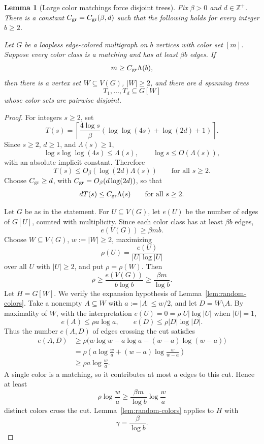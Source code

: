 \documentclass{amsart}
\newtheorem{lemma}[theorem]{Lemma}
\theoremstyle{definition}
\theoremstyle{remark}
\newcommand{\Zpos}{\mathbb{Z}^{+}}
\begin{document}
\begin{lemma}[Large color matchings force disjoint trees]\label{lem:many-matchings}
Fix \(\beta>0\) and \(d\in\Zpos\). There is a constant \(C_{\rm gr}=C_{\rm gr}(\beta,d)\) such that the following holds for every integer \(b\ge2\).

Let \(G\) be a loopless edge-colored multigraph on \(b\) vertices with color set \([m]\). Suppose every color class is a matching and has at least \(\beta b\) edges. If
\[
m\ge C_{\rm gr}\Lambda(b),
\]
then there is a vertex set \(W\subseteq V(G)\), \(|W|\ge2\), and there are \(d\) spanning trees
\[
T_1,\ldots,T_d\subseteq G[W]
\]
whose color sets are pairwise disjoint.
\end{lemma}

\begin{proof}
For integers \(s\ge2\), set
\[
T(s)=
\left\lceil
\frac{4\log s}{\beta}
\left(\log\log(4s)+\log(2d)+1\right)
\right\rceil.
\]
Since \(s\ge2\), \(d\ge1\), and \(\Lambda(s)\ge1\),
\[
\log s\log\log(4s)\le \Lambda(s),
\qquad
\log s\le O(\Lambda(s)),
\]
with an absolute implicit constant. Therefore
\[
T(s)\le O_\beta(\log(2d)\Lambda(s))
\qquad\text{for all }s\ge2.
\]
Choose \(C_{\rm gr}\ge d\), with \(C_{\rm gr}=O_\beta(d\log(2d))\), so that
\[
dT(s)\le C_{\rm gr}\Lambda(s)
\qquad\text{for all }s\ge2.
\]

Let \(G\) be as in the statement. For \(U\subseteq V(G)\), let \(e(U)\) be the number of edges of \(G[U]\), counted with multiplicity. Since each color class has at least \(\beta b\) edges,
\[
e(V(G))\ge \beta mb.
\]
Choose \(W\subseteq V(G)\), \(w:=|W|\ge2\), maximizing
\[
\rho(U)=\frac{e(U)}{|U|\log |U|}
\]
over all \(U\) with \(|U|\ge2\), and put \(\rho=\rho(W)\). Then
\[
\rho\ge \frac{e(V(G))}{b\log b}\ge \frac{\beta m}{\log b}.
\]
Let \(H=G[W]\). We verify the expansion hypothesis of Lemma~\ref{lem:random-colors}. Take a nonempty \(A\subseteq W\) with \(a:=|A|\le w/2\), and let \(D=W\setminus A\). By maximality of \(W\), with the interpretation \(e(U)=0=\rho |U|\log |U|\) when \(|U|=1\),
\[
e(A)\le \rho a\log a,
\qquad
e(D)\le \rho |D|\log |D|.
\]
Thus the number \(e(A,D)\) of edges crossing the cut satisfies
\[
\begin{aligned}
e(A,D)
&\ge \rho\bigl(w\log w-a\log a-(w-a)\log(w-a)\bigr)\\
&=\rho\left(a\log\frac wa+(w-a)\log\frac{w}{w-a}\right)\\
&\ge \rho a\log\frac wa.
\end{aligned}
\]
A single color is a matching, so it contributes at most \(a\) edges to this cut. Hence at least
\[
\rho\log\frac wa
\ge \frac{\beta m}{\log b}\log\frac wa
\]
distinct colors cross the cut. Lemma~\ref{lem:random-colors} applies to \(H\) with
\[
\gamma=\frac{\beta}{\log b}.
\]


\end{proof}
\end{document}
